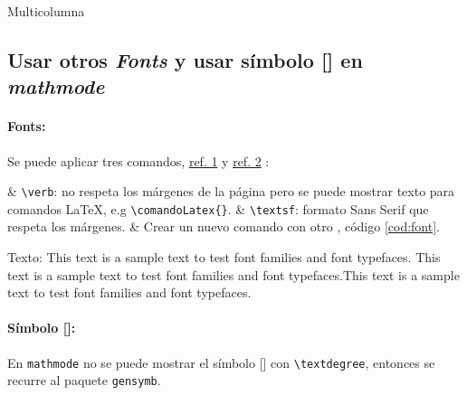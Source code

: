 \begin{algorithm}[H]
	\caption{Multicolumna}\label{alg:}	
	\begin{multicols}{2}
	\end{multicols}	
\end{algorithm}

\subsection{Usar otros \textit{Fonts} y usar símbolo [\degree] en \textit{mathmode}}



\paragraph{Fonts:}
Se puede aplicar tres comandos, \href{http://tex.stackexchange.com/questions/25249/how-do-i-use-a-particular-font-for-a-small-section-of-text-in-my-document/25251#25251}{ref. 1} y \href{https://www.sharelatex.com/learn/Font_typefaces}{ref. 2} :
\Activate
\begin{easylist}[itemize]	
	& \verb|\verb|: no respeta los márgenes de la página pero se puede mostrar texto  para comandos \LaTeX, e.g \verb|\comandoLatex{}|.
	& \verb|\textsf|: formato \textsf{Sans Serif} que respeta los márgenes.
	& Crear un nuevo comando con otro , código \ref{cod:font}.	
\end{easylist}
\Deactivate

\textsf{Texto: This text is a sample text to test font families and font typefaces. This text is a sample text to test font families and font typefaces.This text is a sample text to test font families and font typefaces.}


\paragraph{Símbolo [\degree]:}
En \verb|mathmode| no se puede mostrar el símbolo [\degree] con \verb|\textdegree|, entonces se recurre al paquete \verb|gensymb|.

